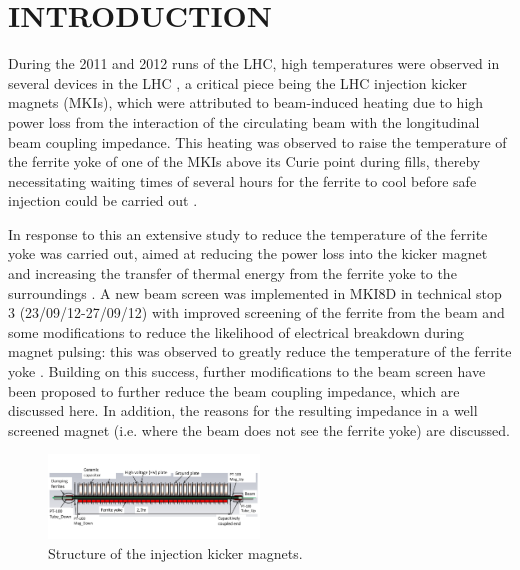 \documentclass{JAC2003}
\begin{document}
% 

\section{INTRODUCTION}

During the 2011 and 2012 runs of the LHC, high temperatures were observed in several devices in the LHC  \cite{metral_cham2012}, a critical piece being the LHC injection kicker magnets (MKIs), which were attributed to beam-induced heating due to high power loss from the interaction of the circulating beam with the longitudinal beam coupling impedance. This heating was observed to raise the temperature of the ferrite yoke of one of the MKIs above its Curie point during fills, thereby necessitating waiting times of several hours for the ferrite to cool before safe injection could be carried out \cite{mki-heating}. 

In response to this an extensive study to reduce the temperature of the ferrite yoke was carried out, aimed at reducing the power loss into the kicker magnet and increasing the transfer of thermal energy from the ferrite yoke to the surroundings \cite{mki-heatingTemp}. A new beam screen was implemented in MKI8D in technical stop 3 (23/09/12-27/09/12) with improved screening of the ferrite from the beam and some modifications to reduce the likelihood of electrical breakdown during magnet pulsing: this was observed to greatly reduce the temperature of the ferrite yoke \cite{mki-heatingTemp}. Building on this success, further modifications to the beam screen have been proposed to further reduce the beam coupling impedance, which are discussed here. In addition, the reasons for the resulting impedance in a well screened magnet (i.e. where the beam does not see the ferrite yoke) are discussed. 

\begin{figure}
\includegraphics[width=0.5\textwidth]{MKICrossSectionYZ.pdf}
\caption{Structure of the injection kicker magnets.}
\label{fig:mkiStruct}
\end{figure}
\end{document}
